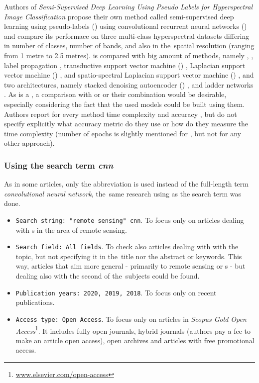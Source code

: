 Authors of \textit{Semi-Supervised Deep Learning Using Pseudo Labels for Hyperspectral Image Classification} propose their own method called semi-supervised deep learning using pseudo-labels () using convolutional recurrent neural networks () and compare its performace on three multi-class hyperspectral datasets differing in number of classes, number of bands, and also in the~spatial resolution (ranging from 1 metre to 2.5 metres).  is compared with big amount of  methods, namely , , label propagation \cite{label-prop}, transductive support vector machine () \cite{tsvm}, Laplacian support vector machine () \cite{lapsvm}, and spatio-spectral Laplacian support vector machine () \cite{ss-lapsvm}, and two  architectures, namely stacked denoising autoencoder () \cite{sda}, and ladder networks \cite{ladder-networks}. As  is a , a comparison with  or  or their combination would be desirable, especially considering the fact that the used  models could be built using them. Authors report for every method time complexity and accuracy , but do not specify explicitly what accuracy metric do they use or how do they measure the time complexity (number of epochs is slightly mentioned for , but not for any other approach).

\subsubsection{Using the search term \textit{cnn}}
\label{scopus-papers-cnn}

As in some articles, only the abbreviation \textit{} is used instead of the full-length term \textit{convolutional neural network}, the~same research using \textit{} as the search term was done.

\begin{itemize}
	\item \verb|Search string: "remote sensing" cnn|. To focus only on articles dealing with s in the area of remote sensing.
	\item \verb|Search field: All fields|. To check also articles dealing with with the topic, but not specifying it in the~title nor the abstract or keywords. This way, articles that aim more general - primarily to remote sensing or s - but dealing also with the second of the~subjects could be found.
	\item \verb|Publication years: 2020, 2019, 2018|. To focus only on recent publications.
	\item \verb|Access type: Open Access|. To focus only on articles in \textit{Scopus Gold Open Access}\footnote{\url{www.elsevier.com/open-access}}. It includes fully open journals, hybrid journals (authors pay a fee to make an article open access), open archives and articles with free promotional access.
\end{itemize}


